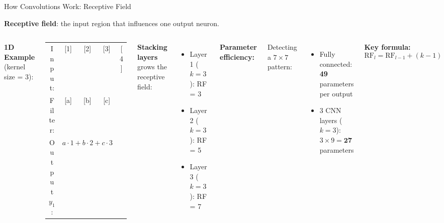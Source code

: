 \documentclass[aspectratio=169]{beamer}
\begin{document}
\begin{frame}{How Convolutions Work: Receptive Field}

\textbf{Receptive field}: the input region that influences one output neuron.

\vspace{0.3cm}
\begin{columns}
\textbf{1D Example} (kernel size = 3):
\begin{center}
\ttfamily\small
\begin{tabular}{ccccc}
Input: & [1] & [2] & [3] & [4] \\
Filter: & [a] & [b] & [c] & \\
Output $y_1$: & \multicolumn{3}{c}{$a{\cdot}1 + b{\cdot}2 + c{\cdot}3$} \\
\end{tabular}
\end{center}

\vspace{0.3cm}
\textbf{Stacking layers} grows the receptive field:
\begin{itemize}
    \item Layer 1 ($k=3$): RF = 3
    \item Layer 2 ($k=3$): RF = 5
    \item Layer 3 ($k=3$): RF = 7
\end{itemize}

\textbf{Parameter efficiency:}

Detecting a $7{\times}7$ pattern:
\begin{itemize}
    \item Fully connected: \textbf{49} parameters per output
    \item 3 CNN layers ($k{=}3$): $3\times9 = \textbf{27}$ parameters
\end{itemize}

\vspace{0.3cm}
\textbf{Key formula:}
\[
\text{RF}_l = \text{RF}_{l-1} + (k-1)
\]
\end{columns}
\end{frame}
\end{document}
